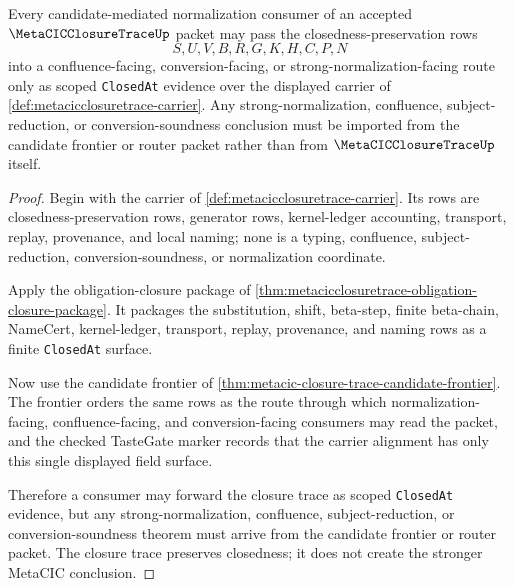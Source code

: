 \begin{theorem}
\label{thm:metacic-confluence-audit-scoped-obligation-route}
Every candidate-mediated normalization consumer of an accepted $\MetaCICClosureTraceUp$ packet may pass the closedness-preservation rows
$$
S,U,V,B,R,G,K,H,C,P,N
$$
into a confluence-facing, conversion-facing, or strong-normalization-facing route only as scoped \texttt{ClosedAt} evidence over the displayed carrier of \autoref{def:metacicclosuretrace-carrier}. Any strong-normalization, confluence, subject-reduction, or conversion-soundness conclusion must be imported from the candidate frontier or router packet rather than from $\MetaCICClosureTraceUp$ itself.
\end{theorem}
\begin{proof}
Begin with the carrier of \autoref{def:metacicclosuretrace-carrier}. Its rows are closedness-preservation rows, generator rows, kernel-ledger accounting, transport, replay, provenance, and local naming; none is a typing, confluence, subject-reduction, conversion-soundness, or normalization coordinate.

Apply the obligation-closure package of \autoref{thm:metacicclosuretrace-obligation-closure-package}. It packages the substitution, shift, beta-step, finite beta-chain, NameCert, kernel-ledger, transport, replay, provenance, and naming rows as a finite \texttt{ClosedAt} surface.

Now use the candidate frontier of \autoref{thm:metacic-closure-trace-candidate-frontier}. The frontier orders the same rows as the route through which normalization-facing, confluence-facing, and conversion-facing consumers may read the packet, and the checked TasteGate marker records that the carrier alignment has only this single displayed field surface.

Therefore a consumer may forward the closure trace as scoped \texttt{ClosedAt} evidence, but any strong-normalization, confluence, subject-reduction, or conversion-soundness theorem must arrive from the candidate frontier or router packet. The closure trace preserves closedness; it does not create the stronger MetaCIC conclusion.
\end{proof}

